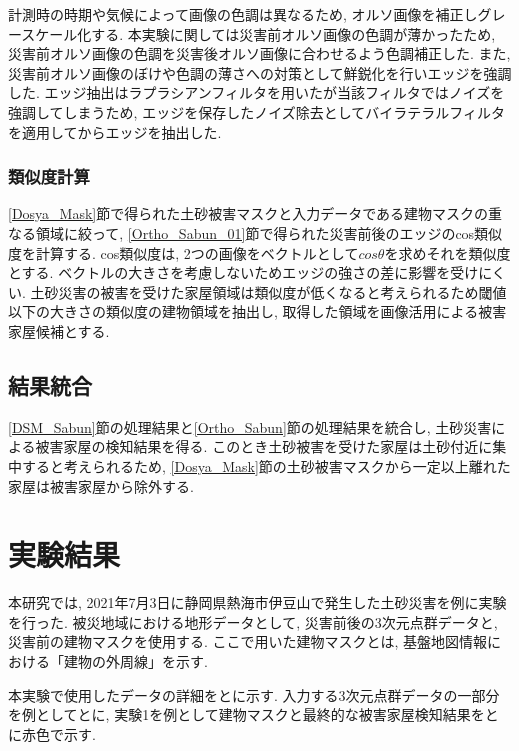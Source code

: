\documentclass[a4paper, twocolumn, xelatex, 10pt, ja=standard, Ligatures=TeX]{bxjsarticle}
\begin{document}
				計測時の時期や気候によって画像の色調は異なるため, オルソ画像を補正しグレースケール化する. 
				本実験に関しては災害前オルソ画像の色調が薄かったため, 災害前オルソ画像の色調を災害後オルソ画像に合わせるよう色調補正した. 
				また, 災害前オルソ画像のぼけや色調の薄さへの対策として鮮鋭化を行いエッジを強調した. 
				エッジ抽出はラプラシアンフィルタを用いたが当該フィルタではノイズを強調してしまうため, 
				エッジを保存したノイズ除去としてバイラテラルフィルタを適用してからエッジを抽出した. 

			\subsubsection{類似度計算}\label{Ortho_Sabun_02}
				\ref{Dosya_Mask}節で得られた土砂被害マスクと入力データである建物マスクの重なる領域に絞って, \ref{Ortho_Sabun_01}節で得られた災害前後のエッジのcos類似度を計算する. 
				cos類似度は, 2つの画像をベクトルとして$cos\theta$を求めそれを類似度とする. ベクトルの大きさを考慮しないためエッジの強さの差に影響を受けにくい. 
				土砂災害の被害を受けた家屋領域は類似度が低くなると考えられるため閾値以下の大きさの類似度の建物領域を抽出し, 取得した領域を画像活用による被害家屋候補とする. 

		\subsection{結果統合}\label{All_process_02}
			\ref{DSM_Sabun}節の処理結果と\ref{Ortho_Sabun}節の処理結果を統合し, 土砂災害による被害家屋の検知結果を得る. 
			このとき土砂被害を受けた家屋は土砂付近に集中すると考えられるため, \ref{Dosya_Mask}節の土砂被害マスクから一定以上離れた家屋は被害家屋から除外する. 


	\section{実験結果}
		本研究では, 2021年7月3日に静岡県熱海市伊豆山で発生した土砂災害を例に実験を行った. 
		被災地域における地形データとして, 災害前後の3次元点群データ\cite{bunken05}\cite{bunken06}と, 災害前の建物マスク\cite{bunken07}を使用する. 
		ここで用いた建物マスクとは, 基盤地図情報における「建物の外周線」を示す. 
		
		本実験で使用したデータの詳細をとに示す. 
		入力する3次元点群データの一部分を例としてとに, 
		実験1を例として建物マスクと最終的な被害家屋検知結果をとに赤色で示す. 
\end{document}
